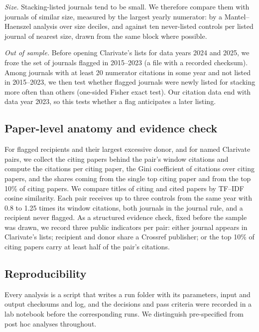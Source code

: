 \emph{Size.} Stacking-listed journals tend to be small. We therefore compare them with journals of similar size,
measured by the largest yearly numerator: by a Mantel--Haenszel analysis over size deciles, and against ten
never-listed controls per listed journal of nearest size, drawn from the same block where possible.

\emph{Out of sample.} Before opening Clarivate's lists for data years 2024 and 2025, we froze the set of journals
flagged in 2015--2023 (a file with a recorded checksum). Among journals with at least 20 numerator citations in some
year and not listed in 2015--2023, we then test whether flagged journals were newly listed for stacking more often
than others (one-sided Fisher exact test). Our citation data end with data year 2023, so this tests whether a flag
anticipates a later listing.

\subsection{Paper-level anatomy and evidence check}
For flagged recipients and their largest excessive donor, and for named Clarivate pairs, we collect the citing papers
behind the pair's window citations and compute the citations per citing paper, the Gini coefficient of citations
over citing papers, and the shares coming from the single top citing paper and from the top 10\% of citing papers. We
compare titles of citing and cited papers by TF--IDF cosine similarity. Each pair receives up to three controls from
the same year with 0.8 to 1.25 times its window citations, both journals in the journal rule, and a recipient never
flagged. As a structured evidence check, fixed before the sample was drawn, we record three public indicators per
pair: either journal appears in Clarivate's lists; recipient and donor share a Crossref publisher; or the top 10\% of
citing papers carry at least half of the pair's citations.

\subsection{Reproducibility}
Every analysis is a script that writes a run folder with its parameters, input and output checksums and log, and the
decisions and pass criteria were recorded in a lab notebook before the corresponding runs. We distinguish
pre-specified from post hoc analyses throughout.

